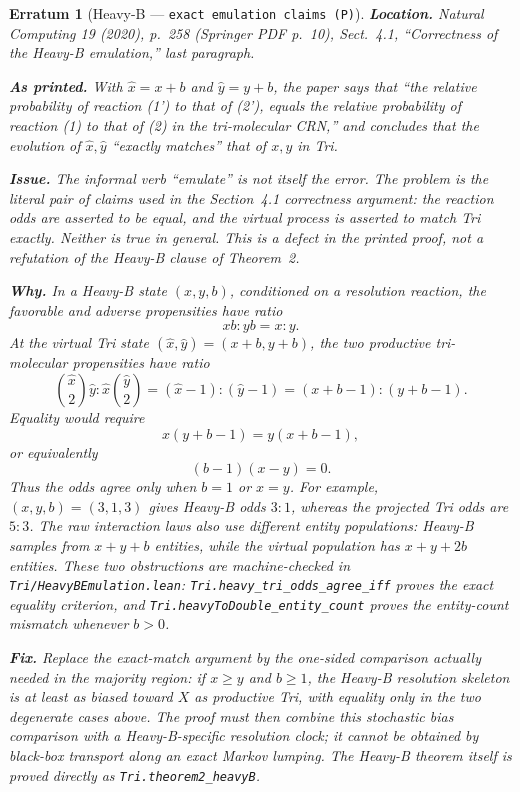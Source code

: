 \documentclass[11pt]{article}
\theoremstyle{erratumstyle}
\newtheorem{erratum}{Erratum}
\begin{document}
\begin{erratum}[Heavy-B --- \texttt{exact emulation claims (P)}]
\textbf{Location.} \emph{Natural Computing} 19 (2020), p.~258
(Springer PDF p.~10), Sect.~4.1, ``Correctness of the Heavy-B emulation,''
last paragraph.

\medskip
\textbf{As printed.} With $\hat x=x+b$ and $\hat y=y+b$, the paper says that
``the relative probability of reaction (1') to that of (2'), equals the
relative probability of reaction (1) to that of (2) in the tri-molecular
CRN,'' and concludes that the evolution of $\hat x,\hat y$ ``exactly matches''
that of $x,y$ in Tri.

\medskip
\textbf{Issue.} The informal verb ``emulate'' is not itself the error. The
problem is the literal pair of claims used in the Section~4.1 correctness
argument: the reaction odds are asserted to be equal, and the virtual process
is asserted to match Tri exactly. Neither is true in general. This is a defect
in the printed proof, not a refutation of the Heavy-B clause of Theorem~2.

\medskip
\textbf{Why.} In a Heavy-B state $(x,y,b)$, conditioned on a resolution
reaction, the favorable and adverse propensities have ratio
\[
  xb:yb=x:y.
\]
At the virtual Tri state $(\hat x,\hat y)=(x+b,y+b)$, the two productive
tri-molecular propensities have ratio
\[
  \binom{\hat x}{2}\hat y:
    \hat x\binom{\hat y}{2}
  = (\hat x-1):(\hat y-1)
  = (x+b-1):(y+b-1).
\]
Equality would require
\[
  x(y+b-1)=y(x+b-1),
\]
or equivalently
\[
  (b-1)(x-y)=0.
\]
Thus the odds agree only when $b=1$ or $x=y$. For example,
$(x,y,b)=(3,1,3)$ gives Heavy-B odds $3:1$, whereas the projected Tri odds
are $5:3$. The raw interaction laws also use different entity populations:
Heavy-B samples from $x+y+b$ entities, while the virtual population has
$x+y+2b$ entities. These two obstructions are machine-checked in
\texttt{Tri/HeavyBEmulation.lean}: \texttt{Tri.heavy\_tri\_odds\_agree\_iff}
proves the exact equality criterion, and
\texttt{Tri.heavyToDouble\_entity\_count} proves the entity-count mismatch
whenever $b>0$.

\medskip
\textbf{Fix.} Replace the exact-match argument by the one-sided comparison
actually needed in the majority region: if $x\ge y$ and $b\ge1$, the Heavy-B
resolution skeleton is at least as biased toward $X$ as productive Tri, with
equality only in the two degenerate cases above. The proof must then combine
this stochastic bias comparison with a Heavy-B-specific resolution clock; it
cannot be obtained by black-box transport along an exact Markov lumping. The
Heavy-B theorem itself is proved directly as
\texttt{Tri.theorem2\_heavyB}.
\end{erratum}
\end{document}
